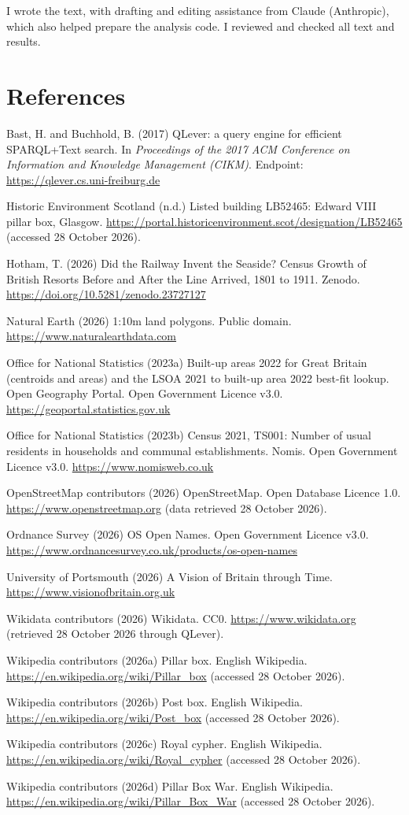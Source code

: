 \documentclass[11pt,a4paper]{article}
\begin{document}
I wrote the text, with drafting and editing assistance from Claude (Anthropic), which also helped prepare the analysis code. I reviewed and checked all text and results.

\section*{References}
\small
Bast, H. and Buchhold, B. (2017) QLever: a query engine for efficient SPARQL+Text search. In \emph{Proceedings of the 2017 ACM Conference on Information and Knowledge Management (CIKM)}. Endpoint: \url{https://qlever.cs.uni-freiburg.de}

Historic Environment Scotland (n.d.) Listed building LB52465: Edward VIII pillar box, Glasgow. \url{https://portal.historicenvironment.scot/designation/LB52465} (accessed 28 October 2026).

Hotham, T. (2026) Did the Railway Invent the Seaside? Census Growth of British Resorts Before and After the Line Arrived, 1801 to 1911. Zenodo. \url{https://doi.org/10.5281/zenodo.23727127}

Natural Earth (2026) 1:10m land polygons. Public domain. \url{https://www.naturalearthdata.com}

Office for National Statistics (2023a) Built-up areas 2022 for Great Britain (centroids and areas) and the LSOA 2021 to built-up area 2022 best-fit lookup. Open Geography Portal. Open Government Licence v3.0. \url{https://geoportal.statistics.gov.uk}

Office for National Statistics (2023b) Census 2021, TS001: Number of usual residents in households and communal establishments. Nomis. Open Government Licence v3.0. \url{https://www.nomisweb.co.uk}

OpenStreetMap contributors (2026) OpenStreetMap. Open Database Licence 1.0. \url{https://www.openstreetmap.org} (data retrieved 28 October 2026).

Ordnance Survey (2026) OS Open Names. Open Government Licence v3.0. \url{https://www.ordnancesurvey.co.uk/products/os-open-names}

University of Portsmouth (2026) A Vision of Britain through Time. \url{https://www.visionofbritain.org.uk}

Wikidata contributors (2026) Wikidata. CC0. \url{https://www.wikidata.org} (retrieved 28 October 2026 through QLever).

Wikipedia contributors (2026a) Pillar box. English Wikipedia. \url{https://en.wikipedia.org/wiki/Pillar_box} (accessed 28 October 2026).

Wikipedia contributors (2026b) Post box. English Wikipedia. \url{https://en.wikipedia.org/wiki/Post_box} (accessed 28 October 2026).

Wikipedia contributors (2026c) Royal cypher. English Wikipedia. \url{https://en.wikipedia.org/wiki/Royal_cypher} (accessed 28 October 2026).

Wikipedia contributors (2026d) Pillar Box War. English Wikipedia. \url{https://en.wikipedia.org/wiki/Pillar_Box_War} (accessed 28 October 2026).
\end{document}
